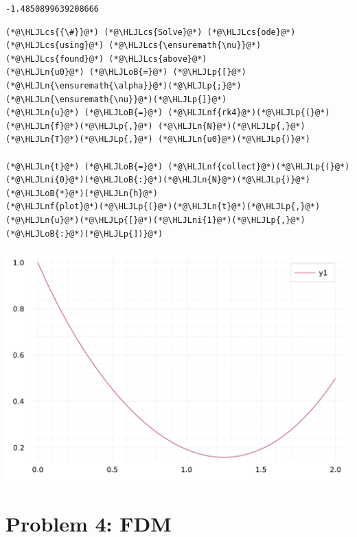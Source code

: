 \documentclass[12pt,a4paper]{article}
\newcommand{\HLJLn}[1]{#1}
\newcommand{\HLJLnf}[1]{\textcolor[RGB]{66,102,213}{#1}}
\newcommand{\HLJLni}[1]{\textcolor[RGB]{59,151,46}{#1}}
\newcommand{\HLJLoB}[1]{\textcolor[RGB]{102,102,102}{\textbf{#1}}}
\newcommand{\HLJLp}[1]{#1}
\newcommand{\HLJLcs}[1]{\textcolor[RGB]{153,153,119}{\textit{#1}}}
\begin{document}
\begin{lstlisting}
-1.4850899639208666
\end{lstlisting}


\begin{lstlisting}
(*@\HLJLcs{{\#}}@*) (*@\HLJLcs{Solve}@*) (*@\HLJLcs{ode}@*) (*@\HLJLcs{using}@*) (*@\HLJLcs{\ensuremath{\nu}}@*) (*@\HLJLcs{found}@*) (*@\HLJLcs{above}@*)
(*@\HLJLn{u0}@*) (*@\HLJLoB{=}@*) (*@\HLJLp{[}@*)(*@\HLJLn{\ensuremath{\alpha}}@*)(*@\HLJLp{;}@*) (*@\HLJLn{\ensuremath{\nu}}@*)(*@\HLJLp{]}@*)
(*@\HLJLn{u}@*) (*@\HLJLoB{=}@*) (*@\HLJLnf{rk4}@*)(*@\HLJLp{(}@*)(*@\HLJLn{f}@*)(*@\HLJLp{,}@*) (*@\HLJLn{N}@*)(*@\HLJLp{,}@*) (*@\HLJLn{T}@*)(*@\HLJLp{,}@*) (*@\HLJLn{u0}@*)(*@\HLJLp{)}@*)

(*@\HLJLn{t}@*) (*@\HLJLoB{=}@*) (*@\HLJLnf{collect}@*)(*@\HLJLp{(}@*)(*@\HLJLni{0}@*)(*@\HLJLoB{:}@*)(*@\HLJLn{N}@*)(*@\HLJLp{)}@*)(*@\HLJLoB{*}@*)(*@\HLJLn{h}@*)
(*@\HLJLnf{plot}@*)(*@\HLJLp{(}@*)(*@\HLJLn{t}@*)(*@\HLJLp{,}@*) (*@\HLJLn{u}@*)(*@\HLJLp{[}@*)(*@\HLJLni{1}@*)(*@\HLJLp{,}@*)(*@\HLJLoB{:}@*)(*@\HLJLp{])}@*)
\end{lstlisting}

\includegraphics[width=\linewidth]{figures/ass_4_report_7_1.pdf}

\section{Problem 4: FDM}
\end{document}
